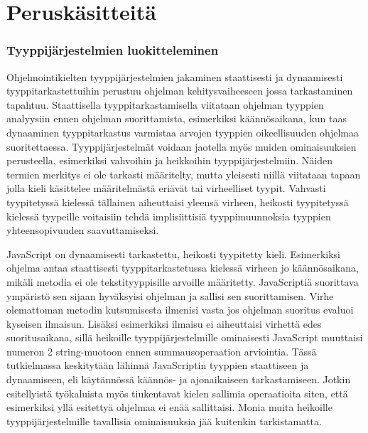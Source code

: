 \chapter{Peruskäsitteitä}

\subsection{Tyyppijärjestelmien luokitteleminen}
Ohjelmointikielten tyyppijärjestelmien jakaminen staattisesti ja dynaamisesti
tyyppitarkastettuihin perustuu ohjelman kehitysvaiheeseen jossa tarkastaminen
tapahtuu. Staattisella tyyppitarkastamisella viitataan ohjelman tyyppien
analyysiin ennen ohjelman suorittamista, esimerkiksi käännösaikana, kun taas
dynaaminen tyyppitarkastus varmistaa arvojen tyyppien oikeellisuuden ohjelmaa
suoritettaessa. Tyyppijärjestelmät voidaan jaotella myös muiden
ominaisuuksien perusteella, esimerkiksi vahvoihin ja heikkoihin
tyyppijärjestelmiin. Näiden termien merkitys ei ole tarkasti määritelty,
mutta yleisesti niillä viitataan tapaan jolla kieli käsittelee määritelmästä
eriävät tai virheelliset tyypit\cite{CornellTransitionToOO}. Vahvasti
tyypitetyssä kielessä tällainen aiheuttaisi yleensä virheen, heikosti
tyypitetyssä kielessä tyypeille voitaisiin tehdä implisiittisiä
tyyppimuunnoksia tyyppien yhteensopivuuden saavuttamiseksi.

JavaScript on dynaamisesti tarkastettu, heikosti tyypitetty kieli.
Esimerkiksi ohjelma  antaa
staattisesti tyyppitarkastetussa kielessä virheen jo käännösaikana, mikäli
metodia  ei ole tekstityyppisille arvoille määritetty.
JavaScriptiä suorittava ympäristö sen sijaan hyväksyisi ohjelman ja sallisi
sen suorittamisen. Virhe olemattoman metodin kutsumisesta ilmenisi vasta jos
ohjelman suoritus evaluoi kyseisen ilmaisun. Lisäksi esimerkiksi ilmaisu
 ei aiheuttaisi virhettä edes
suoritusaikana, sillä heikoille tyyppijärjestelmille ominaisesti JavaScript
muuttaisi numeron 2 string-muotoon ennen summausoperaation arviointia. Tässä
tutkielmassa keskitytään lähinnä JavaScriptin tyyppien staattiseen ja
dynaamiseen, eli käytännössä käännös- ja ajonaikaiseen tarkastamiseen. Jotkin
esitellyistä työkaluista myös tiukentavat kielen sallimia operaatioita siten,
että esimerkiksi yllä esitettyä  ohjelmaa
ei enää sallittaisi. Monia muita heikoille tyyppijärjestelmille
tavallisia ominaisuuksia jää kuitenkin tarkistamatta.

